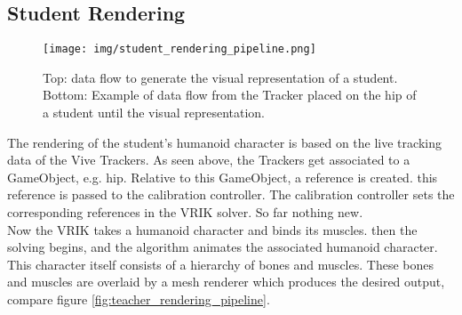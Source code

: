 \subsection{Student Rendering}
\begin{sidewaysfigure}
	\centering
	\texttt{[image: img/student\_rendering\_pipeline.png]}
	\caption{Top: data flow to generate the visual representation of a student. Bottom: Example of data flow from the Tracker placed on the hip of a student until the visual representation.}
	\label{fig:student_rendering_pipeline}
\end{sidewaysfigure}
The rendering of the student's humanoid character is based on the live tracking data of the Vive Trackers. As seen above, the Trackers get associated to a GameObject, e.g. hip. Relative to this GameObject, a reference is created. this reference is passed to the calibration controller. The calibration controller sets the corresponding references in the VRIK solver. So far nothing new.\\
Now the VRIK takes a humanoid character and binds its muscles. then the solving begins, and the algorithm animates the associated humanoid character. This character itself consists of a hierarchy of bones and muscles. These bones and muscles are overlaid by a mesh renderer which produces the desired output, compare figure \ref{fig:teacher_rendering_pipeline}.

